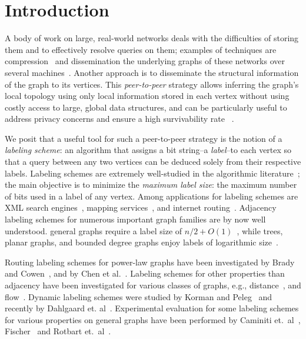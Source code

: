 

\section{Introduction}
A body of work on large, real-world networks  deals with the difficulties of storing them and to effectively resolve queries on them; examples of techniques are
compression~\cite{boldi2004webgraph,boldi2011layered} and dissemination  the underlying graphs of these networks over several machines~\cite{gonzalez2012powergraph, stanton2012streaming, xie2014distributed}.
Another approach is to disseminate the structural information of the graph to its vertices. This \emph{peer-to-peer} strategy allows inferring the graph's local topology using only local information stored in each vertex without using costly access to large, global data structures, and can be particularly useful to address privacy concerns and ensure a high survivability rate ~\cite{buchegger2009peerson}.

We posit that a useful tool for such a peer-to-peer strategy is the notion of a \emph{labeling scheme}: an algorithm that assigns a bit string--a \emph{label}--to each vertex so that a query between any two vertices can be deduced solely from their respective labels. 
Labeling schemes are extremely well-studied in the algorithmic literature~\cite{katz2004labeling,gavoillea2004distance,brady2006compact,gavoille2007shorter,korman2007compact,Korman07,korman2007general,caminiti2008engineering,dahlgaard2014dynamic,rotbart2014evaluation,alstrup2014adjacency}; the main objective is to minimize the \emph{maximum label size}: the maximum number of bits used in a label of any vertex. Among applications for labeling schemes are  XML search engines~\cite{cohen2010labeling}, mapping services~\cite{abraham2011hub}, and internet routing~\cite{krioukov2004compact}.
Adjacency labeling schemes for  numerous important graph families are by now well understood. 
general graphs  require a label size of $n/2+O(1)$~\cite{moon1965minimal, alstrup2014adjacency}, while 
trees, planar graphs, and bounded degree graphs enjoy labels of logarithmic size~\cite{Alstrup02, gavoille2007shorter, adjiashvili2014labeling}. 

Routing labeling schemes for power-law graphs  have been investigated by Brady and Cowen~\cite{brady2006compact}, and by Chen et al.~\cite{chen2012compact}. Labeling schemes for other properties than adjacency have been investigated for various classes of graphs, e.g., distance~\cite{gavoillea2004distance}, and flow~\cite{katz2004labeling}. 
Dynamic labeling schemes were studied by Korman and Peleg~\cite{korman2007compact,Korman07,korman2007general} and recently by Dahlgaard et. al~\cite{dahlgaard2014dynamic}.
Experimental evaluation for some labeling schemes for various properties on general graphs have been performed by Caminiti et.~al~\cite{caminiti2008engineering}, Fischer~\cite{fischer2009short} and Rotbart et.~al~\cite{rotbart2014evaluation}.


